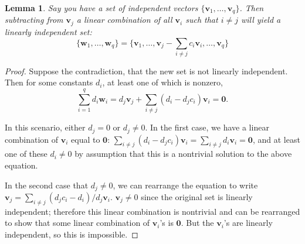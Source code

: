 \documentclass[draft,12pt]{report}
\newtheorem{lemma}{Lemma}
\renewcommand{\vec}[1]{\mathbf{#1}}
\begin{document}
\begin{lemma}
    Say you have a set of independent vectors $\{ \vec{v}_1, \ldots, \vec{v}_q \}$. Then subtracting from $\vec{v}_j$ a linear combination of all $\vec{v}_i$ such that $i \neq j$ will yield a linearly independent set:
    \[ \{ \vec{w}_1, \ldots, \vec{w}_q \} = \{ \vec{v}_1, \ldots, \vec{v}_j - \sum_{i \neq j} c_i \vec{v}_i, \ldots, \vec{v}_q \} \]
\end{lemma}
\begin{proof}
    Suppose the contradiction, that the new set is not linearly independent. Then for some constants $d_i$, at least one of which is nonzero,
    \[ \sum_{i = 1}^q d_i \vec{w}_i = d_j \vec{v}_j + \sum_{i \neq j} (d_i - d_j c_i) \vec{v}_i = \vec{0}. \]
    
    In this scenario, either $d_j = 0$ or $d_j \neq 0$. In the first case, we have a linear combination of $\vec{v}_i$ equal to $\vec{0}$: $\sum_{i \neq j} (d_i - d_j c_i) \vec{v}_i = \sum_{i \neq j} d_i \vec{v}_i = \vec{0}$, and at least one of these $d_i \neq 0$ by assumption that this is a nontrivial solution to the above equation.
    
    In the second case that $d_j \neq 0$, we can rearrange the equation to write $\vec{v}_j = \sum_{i \neq j} (d_j c_i - d_i) / d_j \vec{v}_i$. $\vec{v}_j \neq 0$ since the original set is linearly independent; therefore this linear combination is nontrivial and can be rearranged to show that some linear combination of $\vec{v}_i$'s is $\vec{0}$. But the $\vec{v}_i$'s are linearly independent, so this is impossible.
\end{proof}
\end{document}
